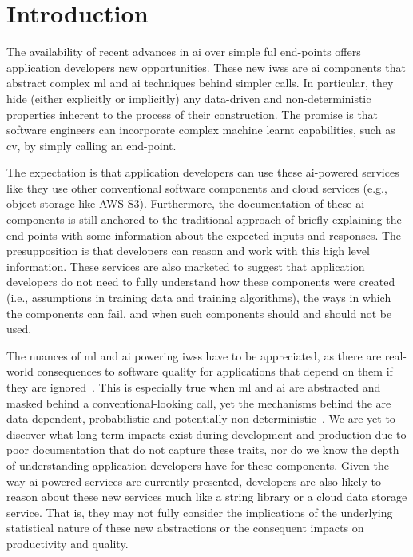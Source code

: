 \section{Introduction}

The availability of recent advances in \gls{ai} over simple ful end-points offers application developers new opportunities. These new \glspl{iws} are \gls{ai} components that abstract complex \gls{ml} and \gls{ai} techniques behind simpler  calls. In particular, they hide (either explicitly or implicitly) any data-driven and non-deterministic properties inherent to the process of their construction. The promise is that software engineers can incorporate complex machine learnt capabilities, such as \gls{cv}, by simply calling an  end-point.

The expectation is that application developers can use these \gls{ai}-powered services like they use other conventional software components and cloud services (e.g., object storage like AWS S3). Furthermore, the documentation of these \gls{ai} components is still anchored to the traditional approach of briefly explaining the end-points with some information about the expected inputs and responses. The presupposition is that developers can reason and work with this high level information. These services are also marketed to suggest that application developers do not need to fully understand how these components were created (i.e., assumptions in training data and training algorithms), the ways in which the components can fail, and when such components should and should not be used.

The nuances of \gls{ml} and \gls{ai} powering \glspl{iws} have to be appreciated, as there are real-world consequences to software quality for applications that depend on them if they are ignored~\citep{Cummaudo:2019icsme}. This is especially true when \gls{ml} and \gls{ai} are abstracted and masked behind a conventional-looking  call, yet the mechanisms behind the  are data-dependent, probabilistic and potentially non-deterministic~\citep{Ohtake:2019vi}. We are yet to discover what long-term impacts exist during development and production due to poor documentation that do not capture these traits, nor do we know the depth of understanding application developers have for these components. Given the way \gls{ai}-powered services are currently presented, developers are also likely to reason about these new services much like a string library or a cloud data storage service. That is, they may not fully consider the implications of the underlying statistical nature of these new abstractions or the consequent impacts on productivity and quality.

